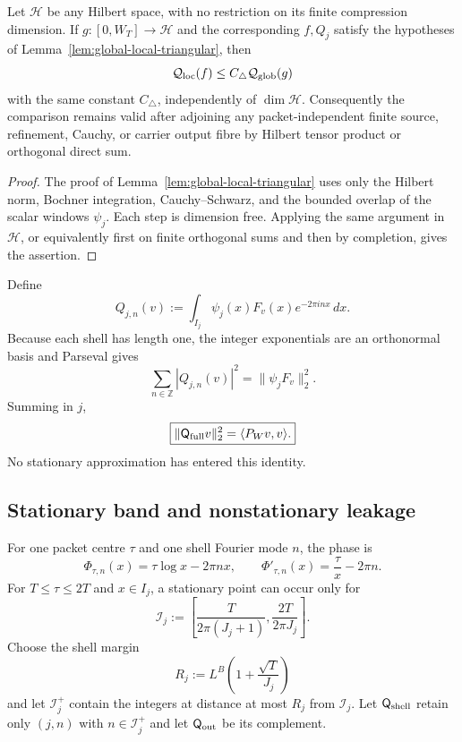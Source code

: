 \begin{corollary}
\label{cor:tensor-global-local-triangular}
Let $\mathcal H$ be any Hilbert space, with no restriction on its finite
compression dimension.  If $g:[0,W_T]\to\mathcal H$ and the corresponding
$f,Q_j$ satisfy the hypotheses of
Lemma~\ref{lem:global-local-triangular}, then
\[
\mathcal Q_{\rm loc}(f)\le
C_\triangle\mathcal Q_{\rm glob}(g)
\]
with the same constant $C_\triangle$, independently of $\dim\mathcal H$.
Consequently the comparison remains valid after adjoining any packet-independent
finite source, refinement, Cauchy, or carrier output fibre by Hilbert tensor
product or orthogonal direct sum.
\end{corollary}

\begin{proof}
The proof of Lemma~\ref{lem:global-local-triangular} uses only the Hilbert norm,
Bochner integration, Cauchy--Schwarz, and the bounded overlap of the scalar
windows $\psi_j$.  Each step is dimension free.  Applying the same argument in
$\mathcal H$, or equivalently first on finite orthogonal sums and then by
completion, gives the assertion.
\end{proof}

Define
\begin{equation}
Q_{j,n}(v):=\int_{I_j}\psi_j(x)F_v(x)e^{-2\pi inx}\,dx.
\label{eq:shell-coeff}
\end{equation}
Because each shell has length one, the integer exponentials are an orthonormal
basis and Parseval gives
\[
\sum_{n\in\mathbb Z}|Q_{j,n}(v)|^2
=\|\psi_jF_v\|_2^2.
\]
Summing in $j$,
\begin{equation}
\boxed{
\|\mathsf Q_{\rm full}v\|_2^2
=\langle P_Wv,v\rangle.
}
\label{eq:full-shell-isometry}
\end{equation}
No stationary approximation has entered this identity.

\subsection{Stationary band and nonstationary leakage}
For one packet centre $\tau$ and one shell Fourier mode $n$, the phase is
\[
\Phi_{\tau,n}(x)=\tau\log x-2\pi nx,
\qquad
\Phi'_{\tau,n}(x)=\frac\tau x-2\pi n.
\]
For $T\le\tau\le2T$ and $x\in I_j$, a stationary point can occur only for
\begin{equation}
\mathcal I_j
:=\left[\frac{T}{2\pi(J_j+1)},
    \frac{2T}{2\pi J_j}\right].
\label{eq:stationary-interval}
\end{equation}
Choose the shell margin
\begin{equation}
R_j:=L^B\left(1+\frac{\sqrt T}{J_j}\right)
\label{eq:shell-margin}
\end{equation}
and let $\mathcal I_j^+$ contain the integers at distance at most $R_j$ from
$\mathcal I_j$. Let $\mathsf Q_{\rm shell}$ retain only $(j,n)$ with
$n\in\mathcal I_j^+$ and let $\mathsf Q_{\rm out}$ be its complement.

